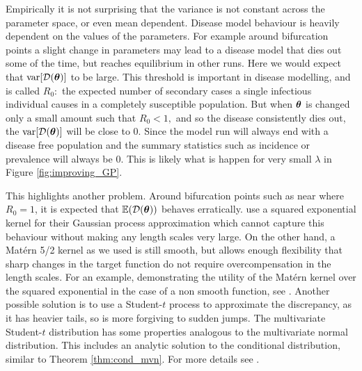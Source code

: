 Empirically it is not surprising that the variance is not constant across the
parameter space, or even mean dependent. Disease model behaviour is heavily
dependent on the values of the parameters. For example around bifurcation points
a slight change in parameters may lead to a disease model that dies out some
of the time, but reaches equilibrium in other runs. Here we would expect that
$\operatorname{var}[\mathcal{D}(\bm{\theta})]$ to be large. This threshold is important in disease 
modelling, and is called $R_0:$ the expected number of secondary cases a single
infectious individual causes in a completely susceptible population.
But when $\bm{\theta}$ is changed only a small
amount such that $R_0<1,$ and so 
the disease consistently dies out, the $\operatorname{var}[\mathcal{D}(\bm{\theta})]$
will be close to $0.$ Since the model
run will always end with a disease free population and the summary statistics
such as incidence or prevalence will always be $0.$ This is likely what is
happen for very small $\lambda$ in Figure \ref{fig:improving_GP}.

This highlights another problem. Around bifurcation points such as near where
$R_0 = 1$, it is expected that
$\operatorname{\mathbb{E}}(\mathcal{D}(\bm{\theta}))$ behaves erratically.  use a
squared exponential kernel for their Gaussian process approximation which
cannot capture this behaviour without
making any length scales very large.
On the other hand, a Mat\'ern 5/2 kernel as we used is still smooth, but allows
enough flexibility that sharp changes in the target function do not require
overcompensation in the length scales.
For an example, demonstrating the utility of the Mat\'ern
kernel over the squared exponential in the case of a non smooth function,
see \cite{jones_matern_2021}.
Another possible solution is to use a Student-$t$ process to approximate the
discrepancy, as it has heavier tails, so is more forgiving to sudden jumps.
The multivariate Student-$t$ distribution has some properties analogous to
the multivariate normal distribution. This includes an analytic solution
to the conditional distribution, similar to Theorem \ref{thm:cond_mvn}. For
more details see \cite{shah_studentt_2014}.

